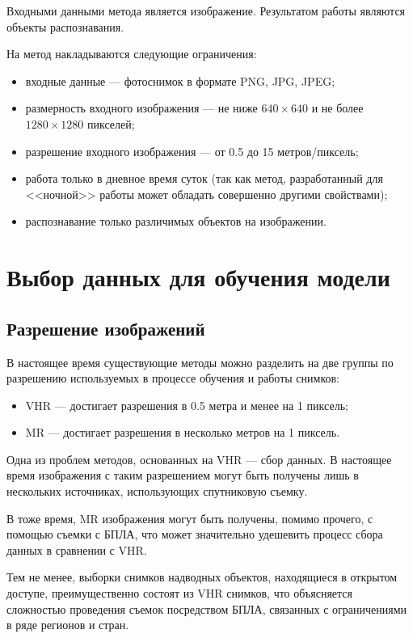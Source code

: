 Входными данными метода является изображение. Результатом работы являются объекты распознавания.

На метод накладываются следующие ограничения:
\begin{itemize}[label=---]
    \item входные данные --- фотоснимок в формате PNG, JPG, JPEG;
    \item размерность входного изображения --- не ниже $640 \times 640$ и не более $1280 \times 1280$ пикселей;
    \item разрешение входного изображения --- от 0.5 до 15 метров/пиксель;
    \item работа только в дневное время суток (так как метод, разработанный для <<ночной>> работы может обладать совершенно другими свойствами);
    \item распознавание только различимых объектов на изображении.
\end{itemize}

\section{Выбор данных для обучения модели}

\subsection{Разрешение изображений}

В настоящее время существующие методы можно разделить на две группы по разрешению используемых в процессе обучения и работы снимков:

\begin{itemize}[label=---]
    \item VHR --- достигает разрешения в 0.5 метра и менее на 1 пиксель;
    \item MR --- достигает разрешения в несколько метров на 1 пиксель.
\end{itemize}

Одна из проблем методов, основанных на VHR --- сбор данных. В настоящее время изображения с таким разрешением могут быть получены лишь в нескольких источниках, использующих спутниковую съемку.

В тоже время, MR изображения могут быть получены, помимо прочего, с помощью съемки с БПЛА, что может значительно удешевить процесс сбора данных в сравнении с VHR.

Тем не менее, выборки снимков надводных объектов, находящиеся в открытом доступе, преимущественно состоят из VHR снимков, что объясняется сложностью проведения съемок посредством БПЛА, связанных с ограничениями в ряде регионов и стран.

